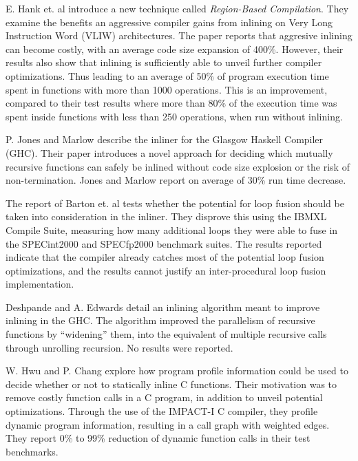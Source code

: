 E. Hank et. al \cite{RegionBasedCompilationIntroduction} introduce a new
technique called \textit{Region-Based Compilation}. They examine the benefits an
aggressive compiler gains from inlining on Very Long Instruction Word (VLIW)
architectures. The paper reports that aggresive inlining can become costly, with
an average code size expansion of 400\%. However, their results also show that
inlining is sufficiently able to unveil further compiler optimizations. Thus
leading to an average of 50\% of program execution time spent in functions with
more than 1000 operations. This is an improvement, compared to their test
results where more than 80\% of the execution time was spent inside functions
with less than 250 operations, when run without inlining.

P. Jones and Marlow \cite{GHCPaper} describe the inliner for the Glasgow Haskell
Compiler (GHC). Their paper introduces a novel approach for deciding which
mutually recursive functions can safely be inlined without code size explosion
or the risk of non-termination. Jones and Marlow report on average of 30\% run
time decrease.

The report of Barton et. al \cite{ShouldLoopOptsInfluenceInlining} tests whether
the potential for loop fusion should be taken into consideration in the inliner.
They disprove this using the IBM\textregistered XL Compile Suite, measuring how
many additional loops they were able to fuse in the SPECint2000 and SPECfp2000
benchmark suites. The results reported indicate that the compiler already
catches most of the potential loop fusion optimizations, and the results cannot
justify an inter-procedural loop fusion implementation.

Deshpande and A. Edwards \cite{deshpande2012statically} detail an inlining
algorithm meant to improve inlining in the GHC. The algorithm improved the
parallelism of recursive functions by ``widening'' them, into the equivalent of
multiple recursive calls through unrolling recursion. No results were reported.

W. Hwu and P. Chang \cite{InlineFuncExpCProgs} explore how program profile
information could be used to decide whether or not to statically inline C
functions. Their motivation was to remove costly function calls in a C program,
in addition to unveil potential optimizations. Through the use of the IMPACT-I C
compiler, they profile dynamic program information, resulting in a call graph
with weighted edges. They report 0\% to 99\% reduction of dynamic function calls
in their test benchmarks.
